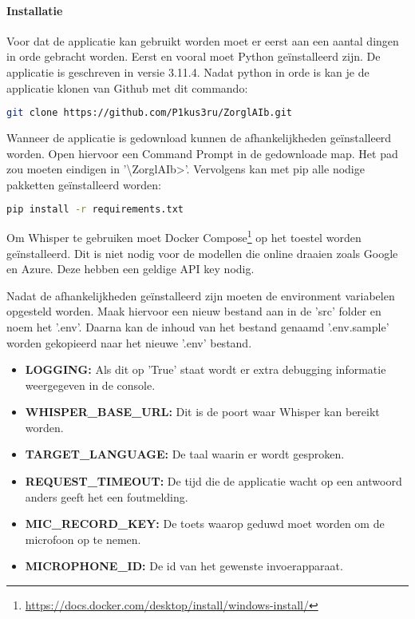 \paragraph{Installatie}
Voor dat de applicatie kan gebruikt worden moet er eerst aan een aantal dingen in orde gebracht worden. Eerst en vooral moet Python geïnstalleerd zijn. De applicatie is geschreven in versie 3.11.4. Nadat python in orde is kan je de applicatie klonen van Github met dit commando:

\begin{lstlisting}[language=bash]
    git clone https://github.com/P1kus3ru/ZorglAIb.git
\end{lstlisting}

Wanneer de applicatie is gedownload kunnen de afhankelijkheden geïnstalleerd worden. Open hiervoor een Command Prompt in de gedownloade map. Het pad zou moeten eindigen in '\textbackslash{}ZorglAIb>'. Vervolgens kan met pip alle nodige pakketten geïnstalleerd worden:

 \begin{lstlisting}[language=bash]
     pip install -r requirements.txt
 \end{lstlisting}

 Om Whisper te gebruiken moet Docker Compose\footnote{\href{https://docs.docker.com/desktop/install/windows-install/}{https://docs.docker.com/desktop/install/windows-install/}} op het toestel worden geïnstalleerd. Dit is niet nodig voor de modellen die online draaien zoals Google en Azure. Deze hebben een geldige API key nodig.

 Nadat de afhankelijkheden geïnstalleerd zijn moeten de environment variabelen opgesteld worden. Maak hiervoor een nieuw bestand aan in de 'src' folder en noem het '.env'. Daarna kan de inhoud van het bestand genaamd '.env.sample' worden gekopieerd naar het nieuwe '.env' bestand.

 \begin{itemize}
     \item \textbf{LOGGING:} Als dit op 'True' staat wordt er extra debugging informatie weergegeven in de console.
     \item \textbf{WHISPER\_BASE\_URL:} Dit is de poort waar Whisper kan bereikt worden.
     \item \textbf{TARGET\_LANGUAGE:} De taal waarin er wordt gesproken.
     \item \textbf{REQUEST\_TIMEOUT:} De tijd die de applicatie wacht op een antwoord anders geeft het een foutmelding.
     \item \textbf{MIC\_RECORD\_KEY:} De toets waarop geduwd moet worden om de microfoon op te nemen.
     \item \textbf{MICROPHONE\_ID:} De id van het gewenste invoerapparaat.
\end{itemize}


